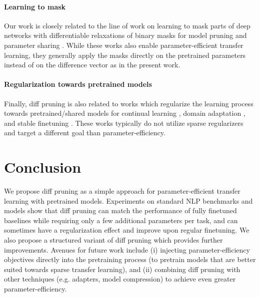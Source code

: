 \paragraph{Learning to mask} Our work is closely related to the line of work on learning to mask parts of deep networks with differentiable relaxations of binary masks for model pruning and parameter sharing \citep{wang2019structuredpruning,zhao2020masking,sanh2020pruning,dixit2020fine,piggyback,Guo_2019_CVPR,sun2020adashare,cao2021low}. While these works also enable parameter-efficient transfer learning, they generally apply the masks directly on the pretrained parameters instead of on the difference vector as in the present work.

\paragraph{Regularization towards pretrained models} Finally, diff pruning is also related to works which regularize the learning process towards pretrained/shared models  for continual learning \citep{rusu106progressive,kirkpatrick2017pnas,schwarz2018progress}, domain adaptation \citep{wiese-etal-2017-neural-domain,miceli-barone-etal-2017-regularization}, and stable finetuning \citep{lee2020mixout}. These works typically do not utilize sparse regularizers and target a different goal than parameter-efficiency.

\section{Conclusion}

We propose diff pruning as a simple approach for parameter-efficient transfer learning with pretrained models. Experiments on standard NLP benchmarks and models show that diff pruning can match the performance of fully finetuned baselines while requiring only a few additional parameters per task, and can sometimes have a regularization effect and improve upon regular finetuning. We also propose a structured variant of diff pruning which provides further improvements. Avenues for future work include (i) injecting parameter-efficiency objectives directly into the pretraining process (to pretrain models that are better suited towards sparse transfer learning), and (ii) combining diff pruning with other techniques (e.g. adapters, model compression) to achieve even greater parameter-efficiency.


